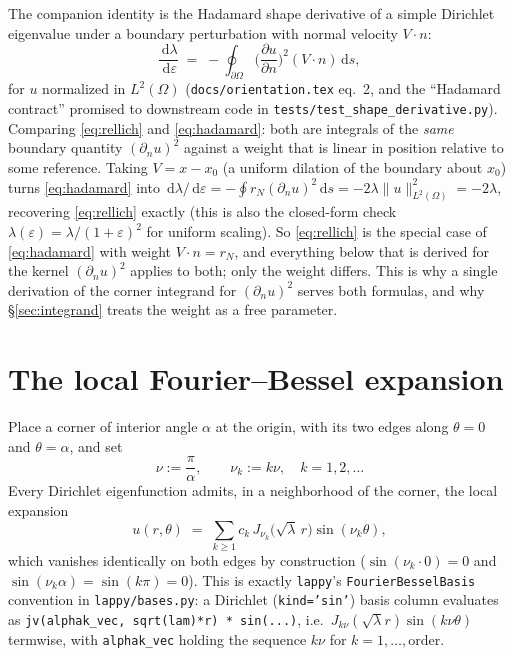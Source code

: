 \documentclass[11pt]{article}
\theoremstyle{remark}
\newcommand{\dd}{\,\mathrm{d}}
\newcommand{\Om}{\Omega}
\newcommand{\pdn}[1]{\frac{\partial #1}{\partial n}}
\newcommand{\code}[1]{\texttt{#1}}
\begin{document}
The companion identity is the Hadamard shape derivative of a simple Dirichlet eigenvalue under a
boundary perturbation with normal velocity $V\cdot n$:
\begin{equation}\label{eq:hadamard}
  \frac{\dd\lambda}{\dd\varepsilon} \;=\; -\oint_{\partial\Om}\Big(\pdn{u}\Big)^{\!2}(V\cdot n)\dd s,
\end{equation}
for $u$ normalized in $L^2(\Om)$ (\code{docs/orientation.tex} eq.~2, and the ``Hadamard
contract'' promised to downstream code in \code{tests/test\_shape\_derivative.py}). Comparing
\eqref{eq:rellich} and \eqref{eq:hadamard}: both are integrals of the \emph{same} boundary
quantity $(\partial_n u)^2$ against a weight that is linear in position relative to some
reference. Taking $V = x-x_0$ (a uniform dilation of the boundary about $x_0$) turns
\eqref{eq:hadamard} into $\dd\lambda/\dd\varepsilon = -\oint r_N(\partial_n u)^2\dd s = -2\lambda\|u\|^2_{L^2(\Om)} = -2\lambda$,
recovering \eqref{eq:rellich} exactly (this is also the closed-form check $\lambda(\varepsilon) =
\lambda/(1+\varepsilon)^2$ for uniform scaling). So \eqref{eq:rellich} is the special case of
\eqref{eq:hadamard} with weight $V\cdot n = r_N$, and everything below that is derived for the
kernel $(\partial_n u)^2$ applies to both; only the weight differs. This is why a single
derivation of the corner integrand for $(\partial_n u)^2$ serves both formulas, and why
\S\ref{sec:integrand} treats the weight as a free parameter.

\section{The local Fourier--Bessel expansion}\label{sec:expansion}

Place a corner of interior angle $\alpha$ at the origin, with its two edges along $\theta=0$ and
$\theta=\alpha$, and set
\[
  \nu := \frac{\pi}{\alpha}, \qquad \nu_k := k\nu, \quad k=1,2,\dots
\]
Every Dirichlet eigenfunction admits, in a neighborhood of the corner, the local expansion
\begin{equation}\label{eq:u}
  u(r,\theta) \;=\; \sum_{k\ge1} c_k\, J_{\nu_k}\!\big(\sqrt\lambda\,r\big)\sin(\nu_k\theta),
\end{equation}
which vanishes identically on both edges by construction ($\sin(\nu_k\cdot 0)=0$ and
$\sin(\nu_k\alpha)=\sin(k\pi)=0$). This is exactly \code{lappy}'s
\code{FourierBesselBasis} convention in \code{lappy/bases.py}: a Dirichlet
(\code{kind='sin'}) basis column evaluates as \code{jv(alphak\_vec, sqrt(lam)*r) * sin(...)},
i.e.\ $J_{k\nu}(\sqrt\lambda r)\sin(k\nu\theta)$ termwise, with \code{alphak\_vec} holding the
sequence $k\nu$ for $k=1,\dots,\text{order}$.
\end{document}

